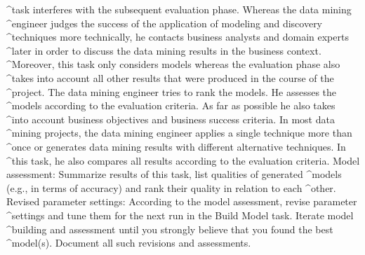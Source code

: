 \begin{AppCPrompt}
\AppCCont@^task interferes with the subsequent evaluation phase. Whereas the data mining
\AppCCont@^engineer judges the success of the application of modeling and discovery
\AppCCont@^techniques more technically, he contacts business analysts and domain experts
\AppCCont@^later in order to discuss the data mining results in the business context.
\AppCCont@^Moreover, this task only considers models whereas the evaluation phase also
\AppCCont@^takes into account all other results that were produced in the course of the
\AppCCont@^project. The data mining engineer tries to rank the models. He assesses the
\AppCCont@^models according to the evaluation criteria. As far as possible he also takes
\AppCCont@^into account business objectives and business success criteria. In most data
\AppCCont@^mining projects, the data mining engineer applies a single technique more than
\AppCCont@^once or generates data mining results with different alternative techniques. In
\AppCCont@^this task, he also compares all results according to the evaluation criteria.
Model assessment: Summarize results of this task, list qualities of generated
\AppCCont@^models (e.g., in terms of accuracy) and rank their quality in relation to each
\AppCCont@^other.
Revised parameter settings: According to the model assessment, revise parameter
\AppCCont@^settings and tune them for the next run in the Build Model task. Iterate model
\AppCCont@^building and assessment until you strongly believe that you found the best
\AppCCont@^model(s). Document all such revisions and assessments.
\end{AppCPrompt}
